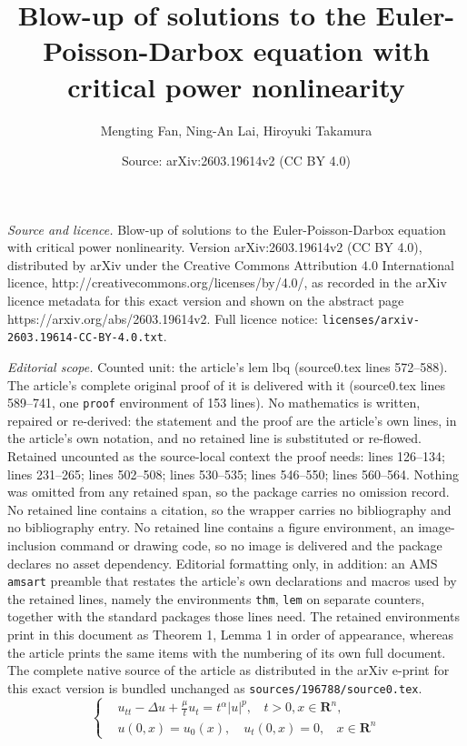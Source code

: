 \documentclass[10pt,a4paper]{amsart}
\title{Blow-up of solutions to the Euler-Poisson-Darbox equation with critical power nonlinearity}
\author{Mengting Fan, Ning-An Lai, Hiroyuki Takamura}
\date{Source: arXiv:2603.19614v2 (CC BY 4.0)}
\newcommand{\R}{\mathbf{R}}
\begin{document}
\maketitle

\noindent\emph{Source and licence.} Blow-up of solutions to the Euler-Poisson-Darbox equation with critical power nonlinearity. Version arXiv:2603.19614v2 (CC BY 4.0), distributed by arXiv under the Creative Commons Attribution 4.0 International licence, http://creativecommons.org/licenses/by/4.0/, as recorded in the arXiv licence metadata for this exact version and shown on the abstract page https://arxiv.org/abs/2603.19614v2. Full licence notice: \texttt{licenses/arxiv-2603.19614-CC-BY-4.0.txt}.\par\smallskip

\noindent\textit{Editorial scope.} Counted unit: the article's lem lbq (source0.tex lines 572--588). The article's complete original proof of it is delivered with it (source0.tex lines 589--741, one \texttt{proof} environment of 153 lines). No mathematics is written, repaired or re-derived: the statement and the proof are the article's own lines, in the article's own notation, and no retained line is substituted or re-flowed.  Retained uncounted as the source-local context the proof needs: lines 126--134; lines 231--265; lines 502--508; lines 530--535; lines 546--550; lines 560--564.  Nothing was omitted from any retained span, so the package carries no omission record.  No retained line contains a citation, so the wrapper carries no bibliography and no bibliography entry.  No retained line contains a figure environment, an image-inclusion command or drawing code, so no image is delivered and the package declares no asset dependency.  Editorial formatting only, in addition: an AMS \texttt{amsart} preamble that restates the article's own declarations and macros used by the retained lines, namely the environments \texttt{thm}, \texttt{lem} on separate counters, together with the standard packages those lines need.  The retained environments print in this document as Theorem 1, Lemma 1 in order of appearance, whereas the article prints the same items with the numbering of its own full document.  The complete native source of the article as distributed in the arXiv e-print for this exact version is bundled unchanged as \texttt{sources/196788/source0.tex}.
\begin{equation}
\label{SHEPD}
\left\{
\begin{aligned}
& u_{tt}-\Delta u+\frac{\mu}{t}u_t=t^\alpha|u|^p, ~~~~t>0, x\in \R^n,\\
& u(0, x)=u_0(x), \quad u_t(0, x)=0,~~~~x\in \R^n
\end{aligned}
\right.
\end{equation}
\end{document}
